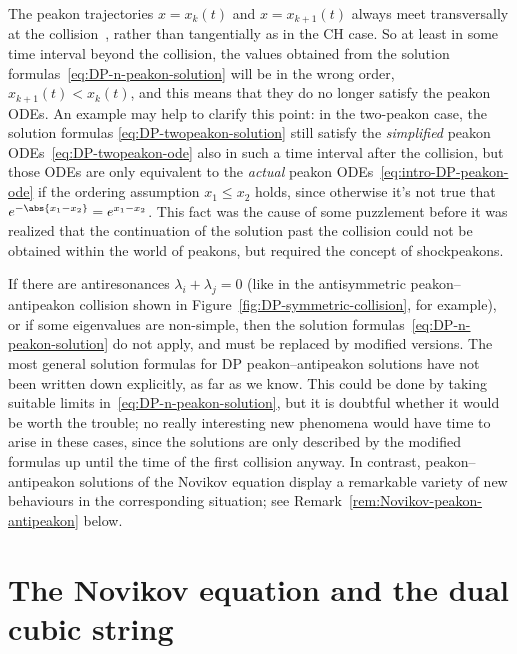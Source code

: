 \documentclass[10pt,a4paper]{article} \pdfoutput=1 
\begin{document}
\begin{remark}
  The peakon trajectories
  $x = x_k(t)$ and $x = x_{k+1}(t)$
  always meet transversally at the collision~\cite[Theorem~4.7]{szmigielski-zhou:2013:DP-colliding-peakons-shock-formation},
  rather than tangentially as in the CH case.
  So at least in some time interval beyond the collision,
  the values obtained from the solution formulas~\eqref{eq:DP-n-peakon-solution}
  will be in the wrong order,
  $x_{k+1}(t) < x_k(t)$,
  and this means that they do no longer satisfy the peakon ODEs.
  An example may help to clarify this point:
  in the two-peakon case, the solution formulas
  \eqref{eq:DP-twopeakon-solution}
  still satisfy the \emph{simplified} peakon ODEs~\eqref{eq:DP-twopeakon-ode}
  also in such a time interval after the collision,
  but those ODEs are only equivalent to the \emph{actual} peakon ODEs~\eqref{eq:intro-DP-peakon-ode}
  if the ordering assumption $x_1 \le x_2$ holds, since otherwise it's not
  true that $e^{-\abs{x_1-x_2}} = e^{x_1-x_2}$.
  This fact was the cause of some puzzlement before it was realized that
  the continuation of the solution past the collision could not be
  obtained within the world of peakons, but required the concept of shockpeakons.

  If there are antiresonances $\lambda_i + \lambda_j = 0$
  (like in the antisymmetric peakon--antipeakon collision shown in Figure~\ref{fig:DP-symmetric-collision},
  for example),
  or if some eigenvalues are non-simple,
  then the solution formulas~\eqref{eq:DP-n-peakon-solution} do not apply, and must be replaced
  by modified versions.
  The most general solution formulas for DP peakon--antipeakon solutions
  have not been written down explicitly, as far as we know.
  This could be done by taking suitable limits in~\eqref{eq:DP-n-peakon-solution},
  but it is doubtful whether it would be worth the trouble;
  no really interesting new phenomena would have time to arise in these cases,
  since the solutions are only described by the modified formulas up until the time of the
  first collision anyway.
  In contrast, peakon--antipeakon solutions of the Novikov equation display a remarkable
  variety of new behaviours in the corresponding situation; see Remark~\ref{rem:Novikov-peakon-antipeakon}
  below.
\end{remark}






\section{The Novikov equation and the dual cubic string}
\label{sec:Novikov}
\end{document}
